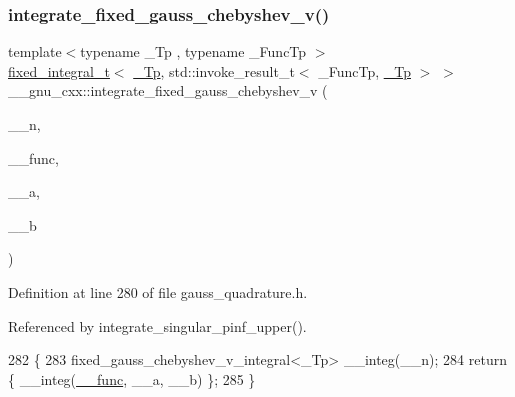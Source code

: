 \subsubsection{\texorpdfstring{integrate\+\_\+fixed\+\_\+gauss\+\_\+chebyshev\+\_\+v()}{integrate\_fixed\_gauss\_chebyshev\_v()}}
{\footnotesize\ttfamily template$<$typename \+\_\+\+Tp , typename \+\_\+\+Func\+Tp $>$ \\
\hyperlink{struct____gnu__cxx_1_1fixed__integral__t}{fixed\+\_\+integral\+\_\+t}$<$ \hyperlink{namespace____gnu__cxx_a3b19a9c800ca194374ef9172290f7d79}{\+\_\+\+Tp}, std\+::invoke\+\_\+result\+\_\+t$<$ \+\_\+\+Func\+Tp, \hyperlink{namespace____gnu__cxx_a3b19a9c800ca194374ef9172290f7d79}{\+\_\+\+Tp} $>$ $>$ \+\_\+\+\_\+gnu\+\_\+cxx\+::integrate\+\_\+fixed\+\_\+gauss\+\_\+chebyshev\+\_\+v (\begin{DoxyParamCaption}\item[{int}]{\+\_\+\+\_\+n,  }\item[{\+\_\+\+Func\+Tp}]{\+\_\+\+\_\+func,  }\item[{\hyperlink{namespace____gnu__cxx_a3b19a9c800ca194374ef9172290f7d79}{\+\_\+\+Tp}}]{\+\_\+\+\_\+a,  }\item[{\hyperlink{namespace____gnu__cxx_a3b19a9c800ca194374ef9172290f7d79}{\+\_\+\+Tp}}]{\+\_\+\+\_\+b }\end{DoxyParamCaption})}



Definition at line 280 of file gauss\+\_\+quadrature.\+h.



Referenced by integrate\+\_\+singular\+\_\+pinf\+\_\+upper().


\begin{DoxyCode}
282     \{
283       fixed\_gauss\_chebyshev\_v\_integral<\_Tp> \_\_integ(\_\_n);
284       \textcolor{keywordflow}{return} \{ \_\_integ(\hyperlink{namespace____gnu__cxx_af2b2f0c7a2ae72b922b1afefae5a65b2}{\_\_func}, \_\_a, \_\_b) \};
285     \}
\end{DoxyCode}
\mbox{\label{namespace____gnu__cxx_a45de562834adf3f097e4ad9a3eb75444}} 
